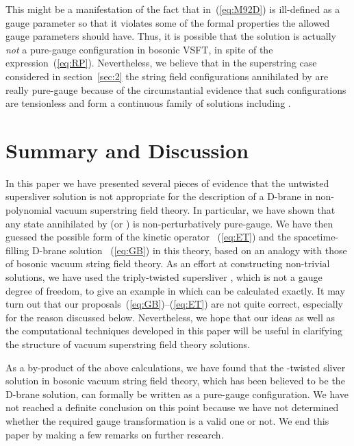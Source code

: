 \documentclass[a4paper,12pt]{article}
\providecommand{\cQ}{\mathcal{Q}}
\providecommand{\tp}{\prime\prime\prime}
\providecommand{\sectiono}[1]{\section{#1}\setcounter{equation}{0}}
\begin{document}
This might be a manifestation of the fact that \myHighlight{$\Lambda$}\coordHE{} in~(\ref{eq:M92D}) is ill-defined as a 
gauge parameter so that it violates some of the formal properties the allowed gauge parameters 
should have. Thus, it is possible that the solution 
\coordHE{} is actually \textit{not} a pure-gauge 
configuration in bosonic VSFT, in spite of the expression~(\ref{eq:RP}). 
Nevertheless, we believe that in the superstring case 
considered in section~\ref{sec:2} the string field configurations annihilated by \coordHE{} are 
really pure-gauge because of the circumstantial evidence that such configurations are tensionless 
and form a continuous family of solutions including \coordHE{}. 


\sectiono{Summary and Discussion}\label{sec:sum}
In this paper we have presented several pieces of evidence that the untwisted supersliver solution 
is not appropriate for the description of a D-brane in non-polynomial vacuum superstring field theory. 
In particular, we have shown that any state 
annihilated by \coordHE{} (or \myHighlight{$\cQ$}\coordHE{}) is non-perturbatively pure-gauge. 
We have then guessed the possible form of the kinetic operator \myHighlight{$\widehat{\cQ}$}\coordHE{}~(\ref{eq:ET}) and 
the spacetime-filling D-brane solution \coordHE{}~(\ref{eq:GB}) in this theory, 
based on an analogy with those of bosonic vacuum string field theory. 
As an effort at constructing non-trivial solutions, 
we have used the triply-twisted supersliver \myHighlight{$\Xi^{\tp}$}\coordHE{}, which is not a gauge degree of freedom, 
to give an example in which \myHighlight{$e^{-\widehat{\Phi}} 
\widehat{\cQ}e^{\widehat{\Phi}}$}\coordHE{} can be calculated exactly. 
It may turn out that our proposals~(\ref{eq:GB})--(\ref{eq:ET}) are not quite correct, especially 
for the reason discussed below. Nevertheless, we hope that our ideas 
as well as the computational techniques developed in this paper 
will be useful in clarifying the structure of vacuum superstring field theory solutions. 

As a by-product of the above calculations, we have found that the \coordHE{}-twisted sliver solution 
in bosonic vacuum string field theory, which has been 
believed to be the D-brane solution, 
can formally be written as a pure-gauge configuration. 
We have not reached a definite conclusion on this point because we have not determined whether 
the required gauge transformation is a valid one or not. 
We end this paper by making a few remarks on further research. 
\medskip
\end{document}
